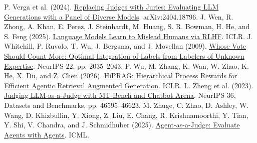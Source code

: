 \documentclass[12pt,letterpaper]{article}
\begin{document}
\begin{thebibliography}{}
 P. Verga et al. (2024). \href{https://arxiv.org/abs/2404.18796}{Replacing Judges with Juries: Evaluating LLM Generations with a Panel of Diverse Models}. arXiv:2404.18796.
 J. Wen, R. Zhong, A. Khan, E. Perez, J. Steinhardt, M. Huang, S. R. Bowman, H. He, and S. Feng (2025). \href{https://arxiv.org/abs/2409.12822}{Language Models Learn to Mislead Humans via RLHF}. ICLR.
 J. Whitehill, P. Ruvolo, T. Wu, J. Bergsma, and J. Movellan (2009). \href{https://proceedings.neurips.cc/paper/2009/hash/f899139df5e1059396431415e770c6dd-Abstract.html}{Whose Vote Should Count More: Optimal Integration of Labels from Labelers of Unknown Expertise}. NeurIPS 22, pp. 2035--2043.
 P. Wu, M. Zhang, K. Wan, W. Zhao, K. He, X. Du, and Z. Chen (2026). \href{https://proceedings.iclr.cc/paper_files/paper/2026/hash/85255cf8f2d2318cc7cffd0b1bc66625-Abstract-Conference.html}{HiPRAG: Hierarchical Process Rewards for Efficient Agentic Retrieval Augmented Generation}. ICLR.
 L. Zheng et al. (2023). \href{https://proceedings.neurips.cc/paper_files/paper/2023/hash/91f18a1287b398d378ef22505bf41832-Abstract.html}{Judging LLM-as-a-Judge with MT-Bench and Chatbot Arena}. NeurIPS 36, Datasets and Benchmarks, pp. 46595--46623.
 M. Zhuge, C. Zhao, D. Ashley, W. Wang, D. Khizbullin, Y. Xiong, Z. Liu, E. Chang, R. Krishnamoorthi, Y. Tian, Y. Shi, V. Chandra, and J. Schmidhuber (2025). \href{https://arxiv.org/abs/2410.10934}{Agent-as-a-Judge: Evaluate Agents with Agents}. ICML.
\end{thebibliography}
\endgroup
\end{document}
